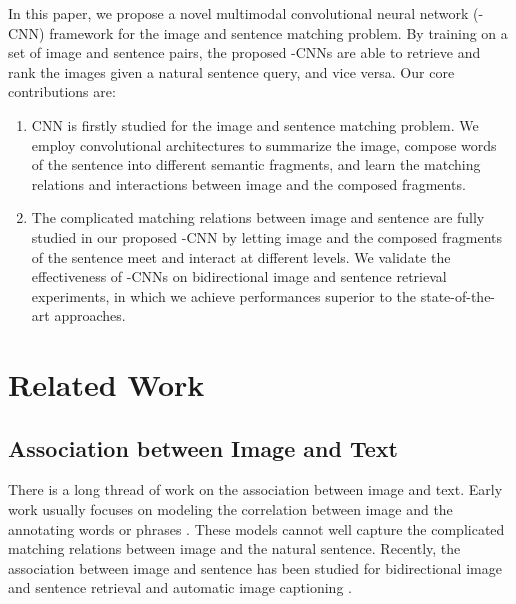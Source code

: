 \documentclass[10pt,twocolumn,letterpaper]{article}
\begin{document}
In this paper, we propose a novel multimodal convolutional neural network (-CNN) framework for the image and sentence matching problem. By training on a set of image and sentence pairs, the proposed -CNNs are able to retrieve and rank the images given a natural sentence query, and vice versa. Our core contributions are:
\begin{enumerate}
  \item CNN is firstly studied for the image and sentence matching problem. We employ convolutional architectures to summarize the image, compose words of the sentence into different semantic fragments, and learn the matching relations and interactions between image and the composed fragments.
\item The complicated matching relations between image and sentence are fully studied in our proposed -CNN by letting image and the composed fragments of the sentence meet and interact at different levels. We validate the effectiveness of -CNNs on bidirectional image and sentence retrieval experiments, in which we achieve performances superior to the state-of-the-art approaches.
\end{enumerate}












\section{Related Work}
\label{sec_related}
\subsection{Association between Image and Text}
There is a long thread of work on the association between image and text. Early work usually focuses on modeling the correlation between image and the annotating words \cite{frome_nips2013, nitish_icml2012, nitish_nips2012,grangier_icann2006, weston_ijcai2011} or phrases \cite{sadeghi_cvpr2011, zitnick_iccv2013}. These models cannot well capture the complicated matching relations between image and the natural sentence. Recently, the association between image and sentence has been studied for bidirectional image and sentence retrieval \cite{hodosh_jair2013, karpathy_2014, socher_tacl2014, yan_cvpr2015, klein_cvpr2015, kiros_2015, plummer_2015} and automatic image captioning \cite{chen_2014,donahue_2014,karpathy_dvsa_2014,kiros_icml2014,kiros_2014,mao_2014,mao_iclr_2015,vinyals_2014}.
\end{document}
